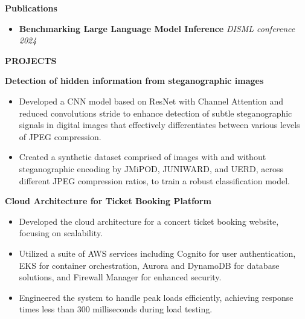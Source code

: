 \documentclass[10pt,a4]{article}
\begin{document}
{\begin{flushleft}
        \vspace{1mm}
        {\large \textbf{Publications}} \\
        \vspace{0.5mm}
        \begin{itemize}
            \item \textbf{Benchmarking Large Language Model Inference} \hfill \textit{DISML conference 2024}
        \end{itemize}
\end{flushleft}

\begin{flushleft}
    {\Large \textbf{PROJECTS}}
    \vspace{1mm}
    \item \textbf{\large Detection of hidden information from steganographic images}
        \vspace{0.5mm}
        \begin{itemize}
            \item Developed a CNN model based on ResNet with Channel Attention and reduced convolutions stride to enhance detection of subtle steganographic signals in digital images that effectively differentiates between various levels of JPEG compression.
            \item Created a synthetic dataset comprised of images with and without steganographic encoding by JMiPOD, JUNIWARD, and UERD, across different JPEG compression ratios, to train a robust classification model.
        \end{itemize}
    \vspace{0.5mm}
    \item \textbf{\large Cloud Architecture for Ticket Booking Platform}
        \vspace{0.5mm}
        \begin{itemize}
            \item Developed the cloud architecture for a concert ticket booking website, focusing on scalability.
            \item Utilized a suite of AWS services including Cognito for user authentication, EKS for container orchestration, Aurora and DynamoDB for database solutions, and Firewall Manager for enhanced security.
            \item Engineered the system to handle peak loads efficiently, achieving response times less than 300 milliseconds during load testing.
        \end{itemize}


\end{flushleft}}
\end{document}
